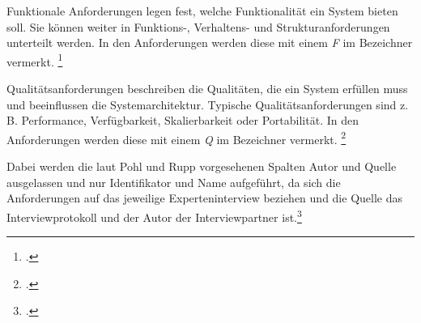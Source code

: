 Funktionale Anforderungen legen fest, welche Funktionalität ein System bieten soll. Sie können weiter in Funktions-, Verhaltens- und Strukturanforderungen unterteilt werden. In den Anforderungen werden diese mit einem \textit{F} im Bezeichner vermerkt.
\footcite[Vgl.][8]{Pohl_2015_Requirements}

Qualitätsanforderungen beschreiben die Qualitäten, die ein System erfüllen muss und beeinflussen die Systemarchitektur. Typische Qualitätsanforderungen sind z. B. Performance, Verfügbarkeit, Skalierbarkeit oder Portabilität. In den Anforderungen werden diese mit einem \textit{Q} im Bezeichner vermerkt.
\footcite[Vgl.][9]{Pohl_2015_Requirements}

Dabei werden die laut Pohl und Rupp vorgesehenen Spalten Autor und Quelle ausgelassen und nur Identifikator und Name aufgeführt, da sich die Anforderungen auf das jeweilige Experteninterview beziehen und die Quelle das Interviewprotokoll und der Autor der Interviewpartner ist.\footcite[Vgl.][126]{Pohl_2015_Requirements}

